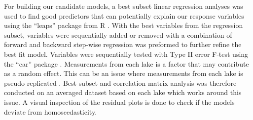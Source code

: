 For building our candidate models, a best subset linear regression analyses was used to find good predictors that can potentially explain our response variables using the ``leaps'' package from R \cite{miller_leaps:_2017}. With the best variables from the regression subset, variables were sequentially added or removed with a combination of forward and backward step-wise regression was preformed to further refine the best fit model. Variables were sequentially tested with Type II error F-test using the ``car'' package \cite{kenward_method_1987, car}. Measurements from each lake is a factor that may contribute as a random effect. This can be an issue where measurements from each lake is pseudo-replicated \cite{eisenhart_assumptions_1947}. Best subset and correlation matrix analysis was therefore conducted on an averaged dataset based on each lake which works around this issue. A visual inspection of the residual plots is done to check if the models deviate from homoscedasticity.  




